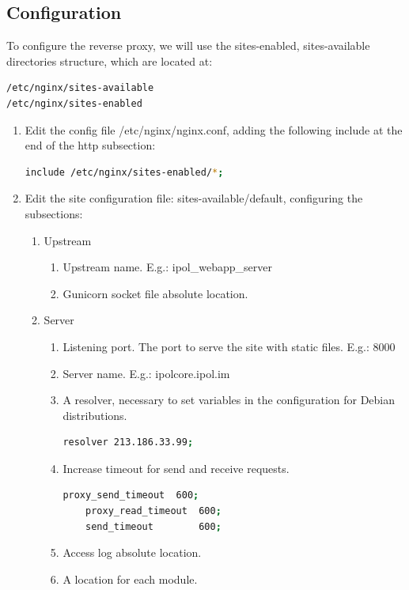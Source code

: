 \documentclass[a4paper,12pt]{article}
\begin{document}
\subsection{Configuration}

To configure the reverse proxy, we will use the sites-enabled, sites-available directories structure, which are located at:
\begin{lstlisting}[language=Bash]
/etc/nginx/sites-available
/etc/nginx/sites-enabled
\end{lstlisting}

\begin{enumerate}
    \item Edit the config file /etc/nginx/nginx.conf, adding the following include at the end of the http subsection:
    \begin{lstlisting}[language=Bash]
    include /etc/nginx/sites-enabled/*;
    \end{lstlisting}
    \item Edit the site configuration file: sites-available/default, configuring the subsections:
    \begin{enumerate}
    \item Upstream
    \begin{enumerate}
    \item Upstream name. E.g.: ipol\_webapp\_server
    \item Gunicorn socket file absolute location.
    \end{enumerate}
    \item Server
    \begin{enumerate}
    \item Listening port. The port to serve the site with static files. E.g.: 8000
    \item Server name. E.g.: ipolcore.ipol.im
    \item A resolver, necessary to set variables in the configuration for Debian distributions.
    \begin{lstlisting}[language=Bash]
    resolver 213.186.33.99;
    \end{lstlisting}
    \item Increase timeout for send and receive requests.
    \begin{lstlisting}[language=Bash]
    proxy_send_timeout	600;
    proxy_read_timeout	600;
    send_timeout		600;
    \end{lstlisting}
    \item Access log absolute location.
    \item A location for each module.

\end{enumerate}
\end{enumerate}
\end{enumerate}
\end{document}
